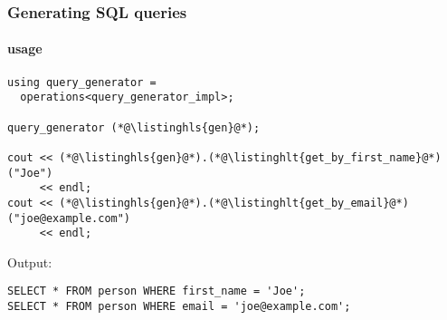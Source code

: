 \documentclass[compress,table,xcolor=table]{beamer}
\begin{document}
\begin{frame}[fragile]
  \frametitle{Generating SQL queries}
  \framesubtitle{usage}
  \begin{lstlisting}[language=c++2x,basicstyle=\small\ttfamily]
using query_generator =
  operations<query_generator_impl>;

query_generator (*@\listinghls{gen}@*);

cout << (*@\listinghls{gen}@*).(*@\listinghlt{get_by_first_name}@*)("Joe")
     << endl;
cout << (*@\listinghls{gen}@*).(*@\listinghlt{get_by_email}@*)("joe@example.com")
     << endl;
  \end{lstlisting}
  Output:
  \begin{verbatim}
SELECT * FROM person WHERE first_name = 'Joe';
SELECT * FROM person WHERE email = 'joe@example.com';
  \end{verbatim}
\end{frame}
\end{document}
